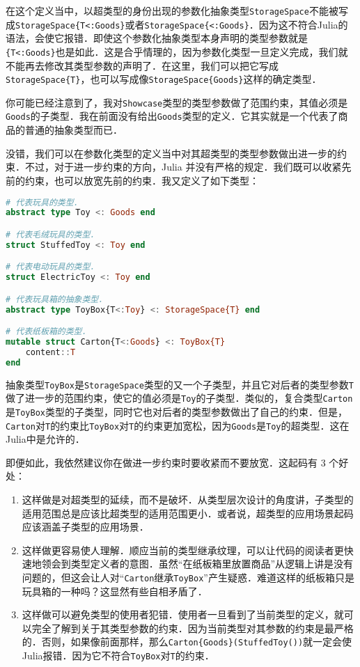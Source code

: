 在这个定义当中，以超类型的身份出现的参数化抽象类型\verb|StorageSpace|不能被写成\verb|StorageSpace{T<:Goods}|或者\verb|StorageSpace{<:Goods}|．因为这不符合Julia的语法，会使它报错．即使这个参数化抽象类型本身声明的类型参数就是\verb|{T<:Goods}|也是如此．这是合乎情理的，因为参数化类型一旦定义完成，我们就不能再去修改其类型参数的声明了．在这里，我们可以把它写成\verb|StorageSpace{T}|，也可以写成像\verb|StorageSpace{Goods}|这样的确定类型．

你可能已经注意到了，我对\verb|Showcase|类型的类型参数做了范围约束，其值必须是\verb|Goods|的子类型．我在前面没有给出\verb|Goods|类型的定义．它其实就是一个代表了商品的普通的抽象类型而已．

没错，我们可以在参数化类型的定义当中对其超类型的类型参数做出进一步的约束．不过，对于进一步约束的方向，Julia 并没有严格的规定．我们既可以收紧先前的约束，也可以放宽先前的约束．我又定义了如下类型：
\begin{lstlisting}[language=julia]
# 代表玩具的类型．
abstract type Toy <: Goods end

# 代表毛绒玩具的类型．
struct StuffedToy <: Toy end

# 代表电动玩具的类型．
struct ElectricToy <: Toy end

# 代表玩具箱的抽象类型．
abstract type ToyBox{T<:Toy} <: StorageSpace{T} end

# 代表纸板箱的类型．
mutable struct Carton{T<:Goods} <: ToyBox{T}
    content::T
end
\end{lstlisting}

抽象类型\verb|ToyBox|是\verb|StorageSpace|类型的又一个子类型，并且它对后者的类型参数\verb|T|做了进一步的范围约束，使它的值必须是\verb|Toy|的子类型．类似的，复合类型\verb|Carton|是\verb|ToyBox|类型的子类型，同时它也对后者的类型参数做出了自己的约束．但是，\verb|Carton|对\verb|T|的约束比\verb|ToyBox|对\verb|T|的约束更加宽松，因为\verb|Goods|是\verb|Toy|的超类型．这在Julia中是允许的．

即便如此，我依然建议你在做进一步约束时要收紧而不要放宽．这起码有 3 个好处：

\begin{enumerate}
\item 这样做是对超类型的延续，而不是破坏．从类型层次设计的角度讲，子类型的适用范围总是应该比超类型的适用范围更小．或者说，超类型的应用场景起码应该涵盖子类型的应用场景．
\item 这样做更容易使人理解．顺应当前的类型继承纹理，可以让代码的阅读者更快速地领会到类型定义者的意图．虽然“在纸板箱里放置商品”从逻辑上讲是没有问题的，但这会让人对“\verb|Carton|继承\verb|ToyBox|”产生疑惑．难道这样的纸板箱只是玩具箱的一种吗？这显然有些自相矛盾了．
\item 这样做可以避免类型的使用者犯错．使用者一旦看到了当前类型的定义，就可以完全了解到关于其类型参数的约束．因为当前类型对其参数的约束是最严格的．否则，如果像前面那样，那么\verb|Carton{Goods}(StuffedToy())|就一定会使Julia报错．因为它不符合\verb|ToyBox|对\verb|T|的约束．
\end{enumerate}

